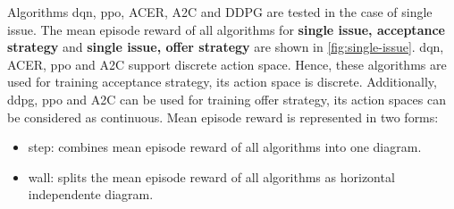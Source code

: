Algorithms \gls{dqn}, \gls{ppo}, ACER\parencite{DBLP:journals/corr/WangBHMMKF16}, A2C and DDPG are tested in the case of single issue. The mean episode reward of all algorithms for \textbf{single issue, acceptance strategy} and \textbf{single issue, offer strategy} are shown in \ref{fig:single-issue}. \gls{dqn}, ACER, \gls{ppo} and A2C support discrete action space. Hence, these algorithms are used for training acceptance strategy, its action space is discrete. Additionally, \gls{ddpg}, \gls{ppo} and A2C can be used for training offer strategy, its action spaces can be considered as continuous. Mean episode reward is represented in two forms: 
\begin{itemize}
\item step: combines mean episode reward of all algorithms into one diagram.
\item wall: splits the mean episode reward of all algorithms as horizontal independente diagram.
\end{itemize}

